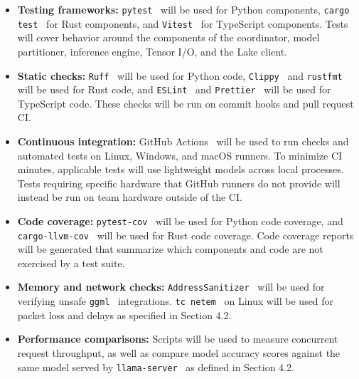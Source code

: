 \documentclass[12pt, titlepage]{article}
\begin{document}
\begin{itemize}
  \item \textbf{Testing frameworks:}
  \texttt{pytest}~\citep{Pytest} will be used for Python components, \texttt{cargo test}~\citep{CargoTest} for Rust components, and \texttt{Vitest}~\citep{Vitest} for TypeScript components. Tests will cover behavior around the components of the coordinator, model partitioner, inference engine, Tensor I/O, and the Lake client.

  \item \textbf{Static checks:}
  \texttt{Ruff}~\citep{Ruff} will be used for Python code, \texttt{Clippy}~\citep{Clippy} and \texttt{rustfmt}~\citep{Rustfmt} will be used for Rust code, and \texttt{ESLint}~\citep{ESLint} and \texttt{Prettier}~\citep{Prettier} will be used for TypeScript code. These checks will be run on commit hooks and pull request CI.

  \item \textbf{Continuous integration:}
  GitHub Actions~\citep{GitHubActions} will be used to run checks and automated tests on Linux, Windows, and macOS runners. To minimize CI minutes, applicable tests will use lightweight models across local processes. Tests requiring specific hardware that GitHub runners do not provide will instead be run on team hardware outside of the CI.

  \item \textbf{Code coverage:}
  \texttt{pytest-cov}~\citep{PytestCov} will be used for Python code coverage, and \texttt{cargo-llvm-cov}~\citep{CargoLlvmCov} will be used for Rust code coverage. Code coverage reports will be generated that summarize which components and code are not exercised by a test suite.

  \item \textbf{Memory and network checks:}
  \texttt{AddressSanitizer}~\citep{AddressSanitizer} will be used for verifying unsafe \texttt{ggml}~\citep{Ggml} integrations. \texttt{tc netem}~\citep{TcNetem} on Linux will be used for packet loss and delays as specified in Section 4.2.

  \item \textbf{Performance comparisons:}
  Scripts will be used to measure concurrent request throughput, as well as compare model accuracy scores against the same model served by \texttt{llama-server}~\citep{LlamaCpp} as defined in Section 4.2.
\end{itemize}
\end{document}
